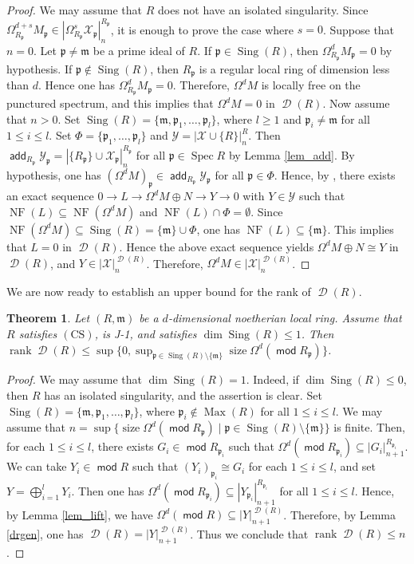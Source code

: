 \documentclass[10pt]{amsart}
\newtheorem{thm}{Theorem}[section]
\theoremstyle{definition}
\theoremstyle{remark}
\numberwithin{equation}{thm}
\def\add{\operatorname{\mathsf{add}}}
\def\d{\operatorname{\mathscr{D}}}
\def\dim{\operatorname{dim}}
\def\ge{\geqslant}
\def\le{\leqslant}
\def\m{\mathfrak{m}}
\def\Max{\operatorname{Max}}
\def\mod{\operatorname{\mathsf{mod}}}
\def\NF{\operatorname{NF}}
\def\p{\mathfrak{p}}
\def\rank{\operatorname{rank}}
\def\Sing{\operatorname{Sing}}
\def\size{\operatorname{size}}
\def\Spec{\operatorname{Spec}}
\def\sup{\operatorname{sup}}
\def\X{\mathcal{X}}
\def\Y{\mathcal{Y}}
\begin{document}
\begin{proof}
We may assume that $R$ does not have an isolated singularity.
Since $\Omega^{d+s}_{R_{\p}}M_{\p}\in{|\Omega_{R_{\p}}^{s}\X_{\p}|}_{n}^{R_{\p}}$, it is enough to prove the case where $s=0$.
Suppose that $n=0$.
Let $\p\neq\m$ be a prime ideal of $R$.
If $\p\in\Sing(R)$, then $\Omega_{R_{\p}}^{d}M_{\p}=0$ by hypothesis.
If $\p\notin\Sing(R)$, then $R_{\p}$ is a regular local ring of dimension less than $d$. 
Hence one has $\Omega_{R_{\p}}^{d}M_{\p}=0$.
Therefore, $\Omega^{d}M$ is locally free on the punctured spectrum, and this implies that $\Omega^{d}M=0$ in $\d(R)$.
Now assume that $n>0$.
Set $\Sing(R)=\{\m,\p_{1},\ldots,\p_{l}\}$, where $l\ge1$ and $\p_{i}\neq\m$ for all $1\le i\le l$.
Set $\Phi=\{\p_{1},\ldots,\p_{l}\}$ and $\Y={|\X\cup \{R\}|}_{n}^{R}$.
Then $\add_{R_{\p}}{\Y}_{\p}={|\{R_{\p}\}\cup  \X_{\p}|}_{n}^{R_{\p}}$ for all $\p\in\Spec R$ by Lemma \ref{lem_add}.
By hypothesis, one has $(\Omega^{d}M)_{\p}\in\add_{R_{\p}}{\Y}_{\p}$ for all $\p\in\Phi$.
Hence, by \cite[Lemma 3.7(2)]{T2023}, there exists an exact sequence $0\to L\to\Omega^{d}M\oplus N\to Y\to0$ with $Y\in\Y$ such that $\NF(L)\subseteq\NF(\Omega^{d}M)$ and $\NF(L)\cap\Phi=\emptyset$.
Since $\NF(\Omega^{d}M)\subseteq \Sing(R)=\{\m\}\cup\Phi$, one has $\NF(L)\subseteq\{\m\}$. 
This implies that $L=0$ in $\d(R)$.
Hence the above exact sequence yields $\Omega^{d}M\oplus N\cong Y$ in $\d(R)$, and $Y\in{|\X|}_{n}^{\d(R)}$.
Therefore, $\Omega^{d}M\in{|\X|}_{n}^{\d(R)}$.
\end{proof}
We are now ready to establish an upper bound for the rank of $\d(R)$.
\begin{thm}\label{upper}
Let $(R,\m)$ be a $d$-dimensional noetherian local ring.
Assume that $R$ satisfies $(\mathrm{CS})$, is J-1, and satisfies $\dim\Sing(R)\le1$.
Then
$\rank\d(R)\le\sup\{0,\sup_{\p\in\Sing(R)\setminus\{\m\}}\size\Omega^{d}(\mod R_{\p})\}$.
\end{thm}
\begin{proof}
We may assume that $\dim\Sing(R)=1$.
Indeed, if $\dim\Sing(R)\le0$, then $R$ has an isolated singularity, and the assertion is clear.
Set $\Sing(R)=\{\m,\p_{1},\ldots,\p_{l}\}$, where $\p_{i}\notin\Max(R)$ for all $1\le i\le l$.
We may assume that $n=\sup\{\size\Omega^{d}(\mod R_{\p})\mid\p\in\Sing(R)\setminus\{\m\}\}$ is finite.
Then, for each $1\le i\le l$, there exists $G_{i}\in\mod R_{\p_{i}}$ such that $\Omega^{d}(\mod R_{\p_{i}})\subseteq{|G_{i}|}^{R_{\p_{i}}}_{n+1}$.
We can take $Y_{i}\in\mod R$ such that $(Y_i)_{\p_i}\cong G_{i}$ for each $1\le i\le l$, and set $Y=\bigoplus_{i=1}^{l}Y_{i}$.
Then one has $\Omega^{d}(\mod R_{\p_{i}})\subseteq{|Y_{\p_{i}}|}^{R_{\p_{i}}}_{n+1}$ for all $1\le i\le l$.
Hence, by Lemma \ref{lem_lift}, we have $\Omega^{d}(\mod R)\subseteq{|Y|}_{n+1}^{\d(R)}$.
Therefore, by Lemma \ref{drgen}, one has $\d(R)={|Y|}_{n+1}^{\d(R)}$.
Thus we conclude that $\rank\d(R)\le n$.
\end{proof}
\end{document}
